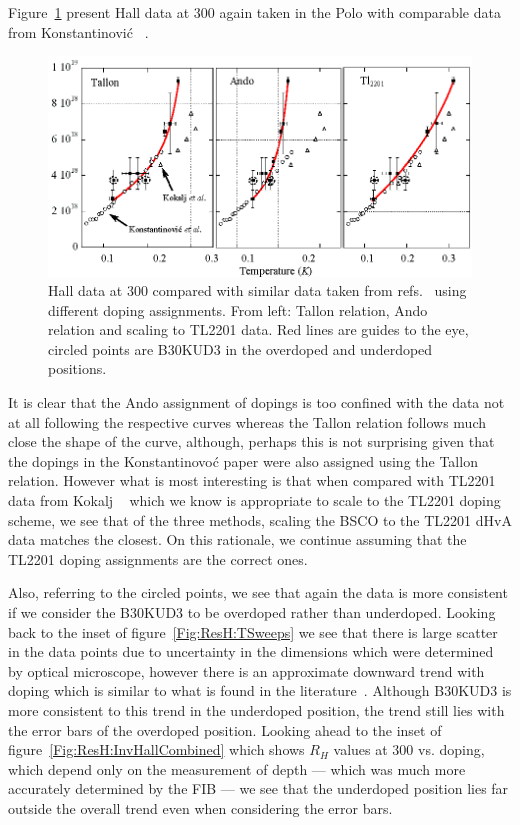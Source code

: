 Figure~\ref{Fig:ResH:Rh300Comparison} present Hall data at \unit{300}{\kelvin} again taken in the Polo with comparable data from Konstantinovi\'c \etal~\cite{Konstantinovic2001}.
\begin{figure}[htbp]
    \begin{center}
        \includegraphics[scale=1.0]{Chapter-HallBSCO/Figures/Rh300Comparison/Rh300Comparison}
        \caption{Hall data at \unit{300}{\kelvin} compared with similar data taken from refs.~\cite{Konstantinovic2001, Kokalj2012} using different doping assignments. From left: Tallon relation, Ando relation and scaling to \ac{TL2201} data. Red lines are guides to the eye, circled points are B30KUD3 in the overdoped and underdoped positions.}
        \label{Fig:ResH:Rh300Comparison}
    \end{center}
\end{figure}
It is clear that the Ando assignment of dopings is too confined with the data not at all following the respective curves whereas the Tallon relation follows much close the shape of the curve, although, perhaps this is not surprising given that the dopings in the Konstantinovo\'c paper were also assigned using the Tallon relation. However what is most interesting is that when compared with \ac{TL2201} data from Kokalj \etal~\cite{Kokalj2012} which we know is appropriate to scale to the \ac{TL2201} doping scheme, we see that of the three methods, scaling the \ac{BSCO} to the \ac{TL2201} \ac{dHvA} data matches the closest. On this rationale, we continue assuming that the \ac{TL2201} doping assignments are the correct ones.

Also, referring to the circled points, we see that again the data is more consistent if we consider the B30KUD3 to be overdoped rather than underdoped. Looking back to the inset of figure~\ref{Fig:ResH:TSweeps} we see that there is large scatter in the data points due to uncertainty in the dimensions which were determined by optical microscope, however there is an approximate downward trend with doping which is similar to what is found in the literature~\cite{Ando2000, Ando1999, Konstantinovic2001, Ono2000}. Although B30KUD3 is more consistent to this trend in the underdoped position, the trend still lies with the error bars of the overdoped position. Looking ahead to the inset of figure~\ref{Fig:ResH:InvHallCombined} which shows $R_H$ values at \unit{300}{\kelvin} vs. doping, which depend only on the measurement of depth --- which was much more accurately determined by the \ac{FIB} --- we see that the underdoped position lies far outside the overall trend even when considering the error bars. 

